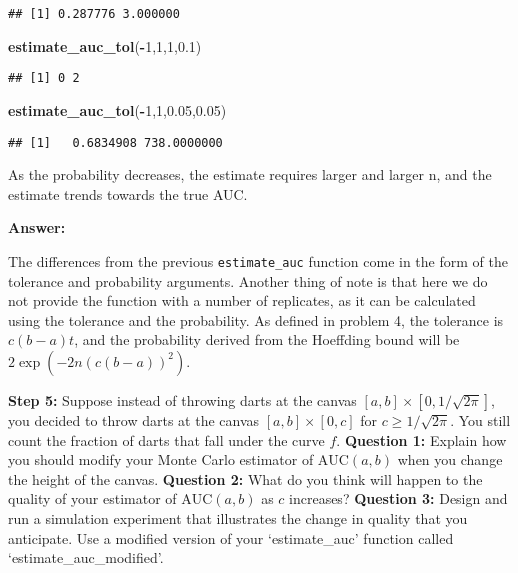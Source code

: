\documentclass[
]{article}
\newenvironment{Shaded}{\begin{snugshade}}{\end{snugshade}}
\newcommand{\DecValTok}[1]{\textcolor[rgb]{0.00,0.00,0.81}{#1}}
\newcommand{\FloatTok}[1]{\textcolor[rgb]{0.00,0.00,0.81}{#1}}
\newcommand{\KeywordTok}[1]{\textcolor[rgb]{0.13,0.29,0.53}{\textbf{#1}}}
\newcommand{\NormalTok}[1]{#1}
\newcommand{\OperatorTok}[1]{\textcolor[rgb]{0.81,0.36,0.00}{\textbf{#1}}}
\begin{document}
\begin{verbatim}
## [1] 0.287776 3.000000
\end{verbatim}

\begin{Shaded}
\begin{Highlighting}[]
\KeywordTok{estimate_auc_tol}\NormalTok{(}\OperatorTok{-}\DecValTok{1}\NormalTok{,}\DecValTok{1}\NormalTok{,}\DecValTok{1}\NormalTok{,}\FloatTok{0.1}\NormalTok{)}
\end{Highlighting}
\end{Shaded}

\begin{verbatim}
## [1] 0 2
\end{verbatim}

\begin{Shaded}
\begin{Highlighting}[]
\KeywordTok{estimate_auc_tol}\NormalTok{(}\OperatorTok{-}\DecValTok{1}\NormalTok{,}\DecValTok{1}\NormalTok{,}\FloatTok{0.05}\NormalTok{,}\FloatTok{0.05}\NormalTok{)}
\end{Highlighting}
\end{Shaded}

\begin{verbatim}
## [1]   0.6834908 738.0000000
\end{verbatim}

As the probability decreases, the estimate requires larger and larger n,
and the estimate trends towards the true AUC.

\textbf{Answer:}

The differences from the previous \texttt{estimate\_auc} function come
in the form of the tolerance and probability arguments. Another thing of
note is that here we do not provide the function with a number of
replicates, as it can be calculated using the tolerance and the
probability. As defined in problem 4, the tolerance is \(c(b-a)t\), and
the probability derived from the Hoeffding bound will be
\(2\exp(-2n(c(b-a))^2)\).

\textbf{Step 5:} Suppose instead of throwing darts at the canvas
\([a, b]\times[0,1/\sqrt{2\pi}]\), you decided to throw darts at the
canvas \([a, b]\times[0,c]\) for \(c \geq 1/\sqrt{2\pi}\). You still
count the fraction of darts that fall under the curve \(f\).
\textbf{Question 1:} Explain how you should modify your Monte Carlo
estimator of \(\text{AUC}(a,b)\) when you change the height of the
canvas. \textbf{Question 2:} What do you think will happen to the
quality of your estimator of \(\text{AUC}(a,b)\) as \(c\) increases?
\textbf{Question 3:} Design and run a simulation experiment that
illustrates the change in quality that you anticipate. Use a modified
version of your `estimate\_auc' function called
`estimate\_auc\_modified'.
\end{document}
